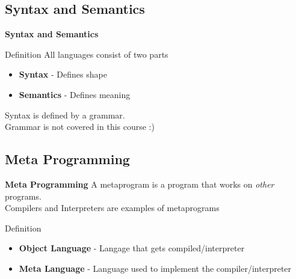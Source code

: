 \subsection{Syntax and Semantics}
\begin{frame}{\textbf{Syntax and Semantics}}
    \begin{block}{Definition}
        All languages consist of two parts
        \begin{itemize}[<+->]
            \item \textbf{Syntax} - Defines shape
            \item \textbf{Semantics} - Defines meaning
        \end{itemize}
    \end{block}
    \Large
    Syntax is defined by a grammar.\\
    Grammar is not covered in this course :)
\end{frame}


\subsection{Meta Programming}
\begin{frame}{\textbf{Meta Programming}}
    A metaprogram is a program that works on \textit{other} programs.\\
    Compilers and Interpreters are examples of metaprograms
    \begin{block}{Definition}
        \begin{itemize}
            \item \textbf{Object Language} - Langage that gets compiled/interpreter
            \item \textbf{Meta Language} - Language used to implement the compiler/interpreter
        \end{itemize}
    \end{block}
\end{frame}

